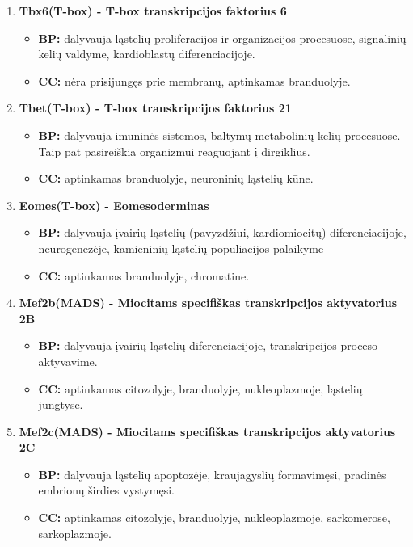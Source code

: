 \documentclass[12pt]{article}
\begin{document}
\begin{enumerate}
    \item \textbf{Tbx6(T-box)\cite{TBX6} - T-box transkripcijos faktorius 6}
        \begin{itemize}
            \item \textbf{BP:} dalyvauja ląstelių proliferacijos
            ir organizacijos procesuose, signalinių kelių valdyme,
            kardioblastų diferenciacijoje.
            \item \textbf{CC:} nėra prisijungęs prie membranų,  
            aptinkamas branduolyje.
        \end{itemize}

    \item \textbf{Tbet(T-box)\cite{TBET} - T-box transkripcijos faktorius 21}
        \begin{itemize}
            \item \textbf{BP:} dalyvauja imuninės sistemos,
            baltymų metabolinių kelių procesuose. Taip pat
            pasireiškia organizmui reaguojant į dirgiklius.
            \item \textbf{CC:} aptinkamas branduolyje, neuroninių ląstelių kūne.
        \end{itemize}

    \item \textbf{Eomes(T-box)\cite{EOMES} - Eomesoderminas}
        \begin{itemize}
            \item \textbf{BP:} dalyvauja įvairių ląstelių (pavyzdžiui,
            kardiomiocitų) diferenciacijoje,
            neurogenezėje, kamieninių ląstelių populiacijos palaikyme
            \item \textbf{CC:} aptinkamas branduolyje, chromatine.
        \end{itemize}

    \item \textbf{Mef2b(MADS)\cite{MEF2B} - Miocitams specifiškas transkripcijos
                  aktyvatorius 2B}
        \begin{itemize}
            \item \textbf{BP:} dalyvauja įvairių ląstelių
            diferenciacijoje, transkripcijos proceso aktyvavime.
            \item \textbf{CC:} aptinkamas citozolyje, branduolyje,
            nukleoplazmoje, ląstelių jungtyse.
        \end{itemize}

    \item \textbf{Mef2c(MADS)\cite{MEF2C} - Miocitams specifiškas transkripcijos
                  aktyvatorius 2C}
        \begin{itemize}
            \item \textbf{BP:} dalyvauja ląstelių apoptozėje,
            kraujagyslių formavimęsi, pradinės embrionų
            širdies vystymęsi.
            \item \textbf{CC:} aptinkamas citozolyje, branduolyje,
            nukleoplazmoje, sarkomerose, sarkoplazmoje.
        \end{itemize}


\end{enumerate}
\end{document}
